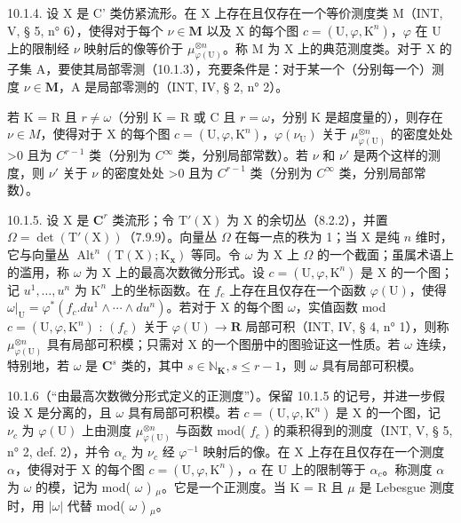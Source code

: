 10.1.4. 设 X 是 C' 类仿紧流形。在 X 上存在且仅存在一个等价测度类 M（INT, V, § 5, n° 6），使得对于每个 \(\nu \in \mathbf{M}\) 以及 X 的每个图 \(c = (\mathrm{U}, \varphi, \mathrm{K}^n)\)，\(\varphi\) 在 U 上的限制经 \(\nu\) 映射后的像等价于 \(\mu_{\varphi(\mathrm{U})}^{\otimes n}\)。称 M 为 X 上的典范测度类。对于 X 的子集 A，要使其局部零测（10.1.3），充要条件是：对于某一个（分别每一个）测度 \(\nu \in \mathbf{M}\)，A 是局部零测的（INT, IV, § 2, n° 2）。

若 K = R 且 \(r \neq \omega\)（分别 K = R 或 C 且 \(r = \omega\)，分别 K 是超度量的），则存在 \(\nu \in M\)，使得对于 X 的每个图 \(c = (\mathrm{U}, \varphi, \mathrm{K}^{n})\)，\(\varphi(\nu_{\mathrm{U}})\) 关于 \(\mu_{\varphi(\mathrm{U})}^{\otimes n}\) 的密度处处 \textgreater0 且为 \(C^{r-1}\) 类（分别为 \(C^{\infty}\) 类，分别局部常数）。若 \(\nu\) 和 \(\nu'\) 是两个这样的测度，则 \(\nu'\) 关于 \(\nu\) 的密度处处 \textgreater0 且为 \(C^{r-1}\) 类（分别为 \(C^{\infty}\) 类，分别局部常数）。

10.1.5. 设 X 是 \(\mathbf{C}^r\) 类流形；令 \(\mathrm{T}'(\mathrm{X})\) 为 X 的余切丛（8.2.2），并置 \(\Omega = \det(\mathrm{T}'(\mathrm{X}))\)（7.9.9）。向量丛 \(\Omega\) 在每一点的秩为 1；当 X 是纯 \(n\) 维时，它与向量丛 \(\operatorname{Alt}^n(\mathrm{T}(\mathrm{X}); \mathrm{K}_{\mathbf{x}})\) 等同。令 \(\omega\) 为 X 上 \(\Omega\) 的一个截面；虽属术语上的滥用，称 \(\omega\) 为 X 上的最高次数微分形式。设 \(c = (\mathrm{U}, \varphi, \mathrm{K}^n)\) 是 X 的一个图；记 \(u^1, \ldots, u^n\) 为 \(\mathrm{K}^n\) 上的坐标函数。在 \(f_c\) 上存在且仅存在一个函数 \(\varphi(\mathrm{U})\)，使得 \(\omega|_{\mathrm{U}} = \varphi^*(f_c.du^1 \wedge \cdots \wedge du^n)\)。若对于 X 的每个图 \(\omega\)，实值函数 mod \(c = (\mathrm{U}, \varphi, \mathrm{K}^n)\) : \((f_c)\) 关于 \(\varphi(\mathrm{U}) \to \mathbf{R}\) 局部可积（INT, IV, § 4, n° 1），则称 \(\mu_{\varphi(\mathrm{U})}^{\otimes n}\) 具有局部可积模；只需对 X 的一个图册中的图验证这一性质。若 \(\omega\) 连续，特别地，若 \(\omega\) 是 \(\mathbf{C}^s\) 类的，其中 \(s \in \mathbb{N}_{\mathbf{K}}, s \leqslant r - 1\)，则 \(\omega\) 具有局部可积模。

10.1.6（“由最高次数微分形式定义的正测度”）。保留 10.1.5 的记号，并进一步假设 X 是分离的，且 \(\omega\) 具有局部可积模。若 \(c = (\mathrm{U}, \varphi, \mathrm{K}^n)\) 是 X 的一个图，记 \(\nu_c\) 为 \(\varphi(\mathrm{U})\) 上由测度 \(\mu_{\varphi(\mathrm{U})}^{\otimes n}\) 与函数 mod( \(f_c\) ) 的乘积得到的测度（INT, V, § 5, n° 2, def. 2），并令 \(\alpha_c\) 为 \(\nu_c\) 经 \(\varphi^{-1}\) 映射后的像。在 X 上存在且仅存在一个测度 \(\alpha\)，使得对于 X 的每个图 \(c = (\mathrm{U}, \varphi, \mathrm{K}^n)\)，\(\alpha\) 在 U 上的限制等于 \(\alpha_c\)。称测度 \(\alpha\) 为 \(\omega\) 的模，记为 mod( \(\omega\) ) \(_\mu\)。它是一个正测度。当 K = R 且 \(\mu\) 是 Lebesgue 测度时，用 \(|\omega|\) 代替 mod( \(\omega\) ) \(_\mu\)。

